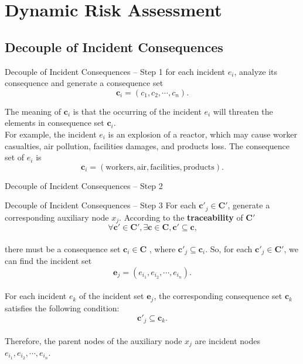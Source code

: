 \label{Section: Dynamic Risk Assessment}
\section{Dynamic Risk Assessment}
\subsection{Decouple of Incident Consequences}
\begin{frame}{Decouple of Incident Consequences -- Step 1}
    \label{Dynamic Risk Assessment: Decouple of Incident Consequences Step 1}
    for each incident $e_i$, analyze its consequence and generate a consequence set
    \[
    \bm{c}_i = (c_1, c_2, \cdots, c_n) \text{.}
    \]

    The meaning of $\bm{c}_i$ is that the occurring of the incident $e_i$ will threaten the elements in consequence set $\bm{c}_i$.\\[10pt]

    For example, the incident $e_i$ is an explosion of a reactor, which may cause worker casualties, air pollution, facilities damages, and products loss. The consequence set of $e_i$ is
    \[
    \bm{c}_i = (\text{workers}, \text{air}, \text{facilities}, \text{products})\text{.}
    \]
\end{frame}

\begin{frame}{Decouple of Incident Consequences -- Step 2}
    \label{Dynamic Risk Assessment: Decouple of Incident Consequences Step 2}
\end{frame}

\begin{frame}{Decouple of Incident Consequences -- Step 3}
    \label{Dynamic Risk Assessment: Decouple of Incident Consequences Step 3}
    For each $\bm{c}'_j \in \bm{C}'$, generate a corresponding auxiliary node $x_j$. According to the \textbf{traceability} of $\bm{C}'$
    \[
    \forall \bm{c}' \in \bm{C}', \exists \bm{c} \in \bm{C}, \bm{c}' \subseteq \bm{c}\text{,}
    \]
    \vspace{-15pt}\\
    there must be a consequence set $\bm{c}_i \in \bm{C}$ , where $\bm{c}'_j \subseteq \bm{c}_i$. \pause So, for each $\bm{c}'_j \in \bm{C}'$, we can find the incident set
    \[
    \bm{e}_j = (e_{i_1},e_{i_2},\cdots,e_{i_n})\text{.}
    \]
    \vspace{-15pt}\\\pause
    For each incident $e_k$ of the incident set $\bm{e}_j$, the corresponding consequence set $\bm{c}_k$ satisfies the following condition:
    \[
    \bm{c}'_j \subseteq \bm{c}_k\text{.}
    \]
    \vspace{-15pt}\\\pause
    Therefore, the parent nodes of the auxiliary node $x_j$ are incident nodes $e_{i_1},e_{i_2},\cdots,e_{i_n}$.
\end{frame}

